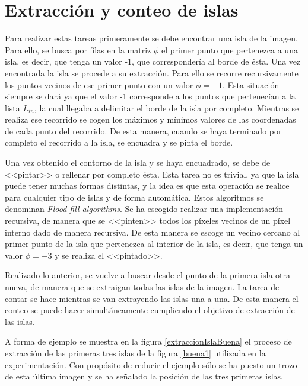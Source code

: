 \section{Extracci\'{o}n y conteo de islas}

Para realizar estas tareas primeramente se debe encontrar una isla de la imagen. Para ello, se busca por filas en la matriz $\phi$ el primer punto que pertenezca a una isla, es decir, que tenga un valor -1, que corresponder\'{i}a al borde de \'{e}sta. Una vez encontrada la isla se procede a su extracci\'{o}n. Para ello se recorre recursivamente los puntos vecinos de ese primer punto con un valor $\phi = -1$. Esta situaci\'{o}n siempre se dar\'{a} ya que el valor -1 corresponde a los puntos que pertenec\'{i}an a la lista $L_{in}$, la cual llegaba a delimitar el borde de la isla por completo. Mientras se realiza ese recorrido se cogen los m\'{a}ximos y m\'{i}nimos valores de las coordenadas de cada punto del recorrido. De esta manera, cuando se haya terminado por completo el recorrido a la isla, se encuadra y se pinta el borde.

Una vez obtenido el contorno de la isla y se haya encuadrado, se debe de <<pintar>> o rellenar por completo \'{e}sta. Esta tarea no es trivial, ya que la isla puede tener muchas formas distintas, y la idea es que esta operaci\'{o}n se realice para cualquier tipo de islas y de forma autom\'{a}tica. Estos algoritmos se denominan \textit{Flood fill algorithms}. Se ha escogido realizar una implementaci\'{o}n recursiva, de manera que se <<pinten>> todos los p\'{i}xeles vecinos de un p\'{i}xel interno dado de manera recursiva. De esta manera se escoge un vecino cercano al primer punto de la isla que pertenezca al interior de la isla, es decir, que tenga un valor $\phi = -3$ y se realiza el <<pintado>>.

Realizado lo anterior, se vuelve a buscar desde el punto de la primera isla otra nueva, de manera que se extraigan todas las islas de la imagen. La tarea de contar se hace mientras se van extrayendo las islas una a una. De esta manera el conteo se puede hacer simult\'{a}neamente cumpliendo el objetivo de extracci\'{o}n de las islas.

A forma de ejemplo se muestra en la figura \ref{extraccionIslaBuena} el proceso de extracci\'{o}n de las primeras tres islas de la figura \ref{buena1} utilizada en la experimentaci\'{o}n. Con prop\'{o}sito de reducir el ejemplo s\'{o}lo se ha puesto un trozo de esta \'{u}ltima imagen y se ha se\~{n}alado la posici\'{o}n de las tres primeras islas.


